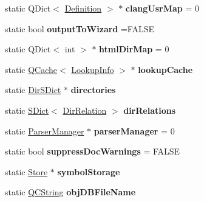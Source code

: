 \begin{DoxyCompactItemize}
\item 
\mbox{\label{class_doxygen_af917c09272753710958b7a4b6ca93bb4}} 
static Q\+Dict$<$ \mbox{\hyperlink{class_definition}{Definition}} $>$ $\ast$ {\bfseries clang\+Usr\+Map} = 0
\item 
\mbox{\label{class_doxygen_a99390d84b1dbddb5e101db17058e7323}} 
static bool {\bfseries output\+To\+Wizard} =F\+A\+L\+SE
\item 
\mbox{\label{class_doxygen_a4ebc263d76c534ae442d9086a986ed0c}} 
static Q\+Dict$<$ int $>$ $\ast$ {\bfseries html\+Dir\+Map} = 0
\item 
\mbox{\label{class_doxygen_a68ae110f5af9b5ceff4a5c9d1cca1607}} 
static \mbox{\hyperlink{class_q_cache}{Q\+Cache}}$<$ \mbox{\hyperlink{struct_lookup_info}{Lookup\+Info}} $>$ $\ast$ {\bfseries lookup\+Cache}
\item 
\mbox{\label{class_doxygen_a7348a6369c6a86bded4abb5154e654cf}} 
static \mbox{\hyperlink{class_dir_s_dict}{Dir\+S\+Dict}} $\ast$ {\bfseries directories}
\item 
\mbox{\label{class_doxygen_adcaa04f254445beb29623884c29976d7}} 
static \mbox{\hyperlink{class_s_dict}{S\+Dict}}$<$ \mbox{\hyperlink{class_dir_relation}{Dir\+Relation}} $>$ {\bfseries dir\+Relations}
\item 
\mbox{\label{class_doxygen_a3882f6ce51621c77d409060e46cae378}} 
static \mbox{\hyperlink{class_parser_manager}{Parser\+Manager}} $\ast$ {\bfseries parser\+Manager} = 0
\item 
\mbox{\label{class_doxygen_a0f0f967e0b97a2292ba58f22b8a1e817}} 
static bool {\bfseries suppress\+Doc\+Warnings} = F\+A\+L\+SE
\item 
\mbox{\label{class_doxygen_ad63a00fa6d4a5378ab8cd988e0b6df16}} 
static \mbox{\hyperlink{class_store}{Store}} $\ast$ {\bfseries symbol\+Storage}
\item 
\mbox{\label{class_doxygen_aa42afb3dcce1fa7ed8fbae8537da4710}} 
static \mbox{\hyperlink{class_q_c_string}{Q\+C\+String}} {\bfseries obj\+D\+B\+File\+Name}

\end{DoxyCompactItemize}
